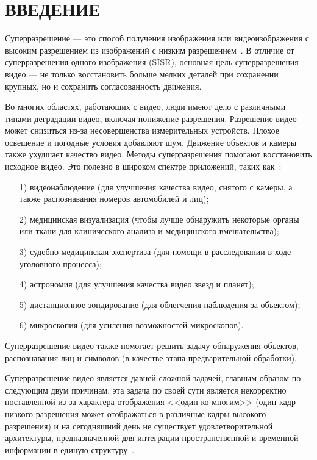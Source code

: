 \documentclass{bmstu}
\begin{document}
{\centering \chapter*{ВВЕДЕНИЕ}}

Суперразрешение --- это способ получения изображения или видеоизображения с высоким разрешением из изображений с низким разрешением~\cite{Park2003}. 
В отличие от суперразрешения одного изображения (SISR), основная цель суперразрешения видео --- не только восстановить больше мелких деталей при сохранении крупных, но и сохранить согласованность движения.

Во многих областях, работающих с видео, люди имеют дело с различными типами деградации видео, включая понижение разрешения. 
Разрешение видео может снизиться из-за несовершенства измерительных устройств. 
Плохое освещение и погодные условия добавляют шум. 
Движение объектов и камеры также ухудшает качество видео. 
Методы суперразрешения помогают восстановить исходное видео. 
Это полезно в широком спектре приложений, таких как~\cite{Daithankar2021}:
\begin{enumerate}
\item[1)] видеонаблюдение (для улучшения качества видео, снятого с камеры, а также распознавания номеров автомобилей и лиц);
\item[2)] медицинская визуализация (чтобы лучше обнаружить некоторые органы или ткани для клинического анализа и медицинского вмешательства);
\item[3)] судебно-медицинская экспертиза (для помощи в расследовании в ходе уголовного процесса);
\item[4)] астрономия (для улучшения качества видео звезд и планет);
\item[5)] дистанционное зондирование (для облегчения наблюдения за объектом);
\item[6)] микроскопия (для усиления возможностей микроскопов).
\end{enumerate}

Суперразрешение видео также помогает решить задачу обнаружения объектов, распознавания лиц и символов (в качестве этапа предварительной обработки).

Суперразрешение видео является давней сложной задачей, главным образом по следующим двум причинам: эта задача по своей сути является некорректно поставленной из-за характера отображения <<один ко многим>> (один кадр низкого разрешения может отображаться в различные кадры высокого разрешения) и на сегодняшний день не существует удовлетворительной архитектуры, предназначенной для интеграции пространственной и временной информации в единую структуру~\cite{Xiaobin2019}.
\end{document}
